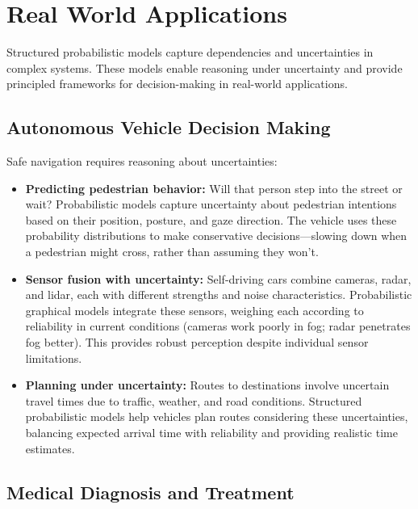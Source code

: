 
\section{Real World Applications}
\label{sec:structured-prob-real-world}

Structured probabilistic models capture dependencies and uncertainties in complex systems. These models enable reasoning under uncertainty and provide principled frameworks for decision-making in real-world applications.

\subsection{Autonomous Vehicle Decision Making}

Safe navigation requires reasoning about uncertainties:

\begin{itemize}
    \item \textbf{Predicting pedestrian behavior:} Will that person step into the street or wait? Probabilistic models capture uncertainty about pedestrian intentions based on their position, posture, and gaze direction. The vehicle uses these probability distributions to make conservative decisions—slowing down when a pedestrian might cross, rather than assuming they won't.
    
    \item \textbf{Sensor fusion with uncertainty:} Self-driving cars combine cameras, radar, and lidar, each with different strengths and noise characteristics. Probabilistic graphical models integrate these sensors, weighing each according to reliability in current conditions (cameras work poorly in fog; radar penetrates fog better). This provides robust perception despite individual sensor limitations.
    
    \item \textbf{Planning under uncertainty:} Routes to destinations involve uncertain travel times due to traffic, weather, and road conditions. Structured probabilistic models help vehicles plan routes considering these uncertainties, balancing expected arrival time with reliability and providing realistic time estimates.
\end{itemize}

\subsection{Medical Diagnosis and Treatment}

